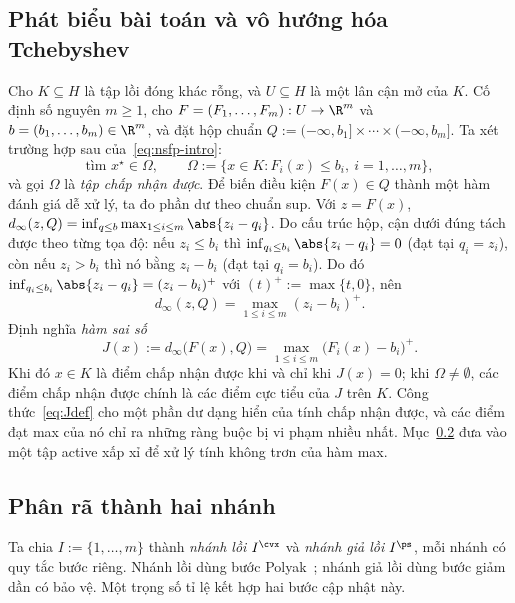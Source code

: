 \subsection{Phát biểu bài toán và vô hướng hóa Tchebyshev}\label{ssec:model-stmt}
Cho $K\subseteq H$ là tập lồi đóng khác rỗng, và $U\subseteq H$ là một lân cận mở
của $K$. Cố định số nguyên $m\ge1$, cho $F=(F_1,\dots,F_m):U\to\R^m$ và
$b=(b_1,\dots,b_m)\in\R^m$, và đặt hộp chuẩn
$Q:=(-\infty,b_1]\times\cdots\times(-\infty,b_m]$. Ta xét trường hợp sau
của~\eqref{eq:nsfp-intro}:
\begin{equation}\label{eq:nsfp-box}
\text{tìm } x^\star\in\Omega,\qquad
\Omega:=\bigl\{x\in K: F_i(x)\le b_i,\ i=1,\dots,m\bigr\},
\end{equation}
và gọi $\Omega$ là \emph{tập chấp nhận được}. Để biến điều kiện $F(x)\in Q$ thành một hàm đánh giá
dễ xử lý, ta đo phần dư theo chuẩn sup. Với $z=F(x)$,
$d_\infty(z,Q)=\inf_{q\le b}\max_{1\le i\le m}\abs{z_i-q_i}$. Do cấu trúc hộp,
cận dưới đúng tách được theo từng tọa độ: nếu $z_i\le b_i$ thì
$\inf_{q_i\le b_i}\abs{z_i-q_i}=0$ (đạt tại $q_i=z_i$), còn nếu $z_i>b_i$ thì nó bằng
$z_i-b_i$ (đạt tại $q_i=b_i$). Do đó $\inf_{q_i\le b_i}\abs{z_i-q_i}=(z_i-b_i)^+$ với
$(t)^+:=\max\{t,0\}$, nên
\begin{equation}\label{eq:dinfty}
d_\infty(z,Q)=\max_{1\le i\le m}(z_i-b_i)^+ .
\end{equation}
Định nghĩa \emph{hàm sai số}
\begin{equation}\label{eq:Jdef}
J(x):=d_\infty\bigl(F(x),Q\bigr)=\max_{1\le i\le m}\bigl(F_i(x)-b_i\bigr)^+ .
\end{equation}
Khi đó $x\in K$ là điểm chấp nhận được khi và chỉ khi $J(x)=0$; khi $\Omega\ne\emptyset$, các điểm
chấp nhận được chính là các điểm cực tiểu của $J$ trên $K$. Công thức~\eqref{eq:Jdef} cho một phần dư dạng hiển của tính chấp nhận được, và các điểm
đạt max của nó chỉ ra những ràng buộc bị vi phạm nhiều nhất. Mục~\ref{ssec:dual-track}
đưa vào một tập active xấp xỉ để xử lý tính không trơn của hàm max.

\subsection{Phân rã thành hai nhánh}\label{ssec:dual-track}
Ta chia $I:=\{1,\dots,m\}$ thành \emph{nhánh lồi} $I^{\cvx}$ và
\emph{nhánh giả lồi} $I^{\ps}$, mỗi nhánh có quy tắc bước riêng. Nhánh lồi dùng bước Polyak~\citep{polyak1969};
nhánh giả lồi dùng bước giảm dần có bảo vệ.
Một trọng số tỉ lệ kết hợp hai bước cập nhật này.

